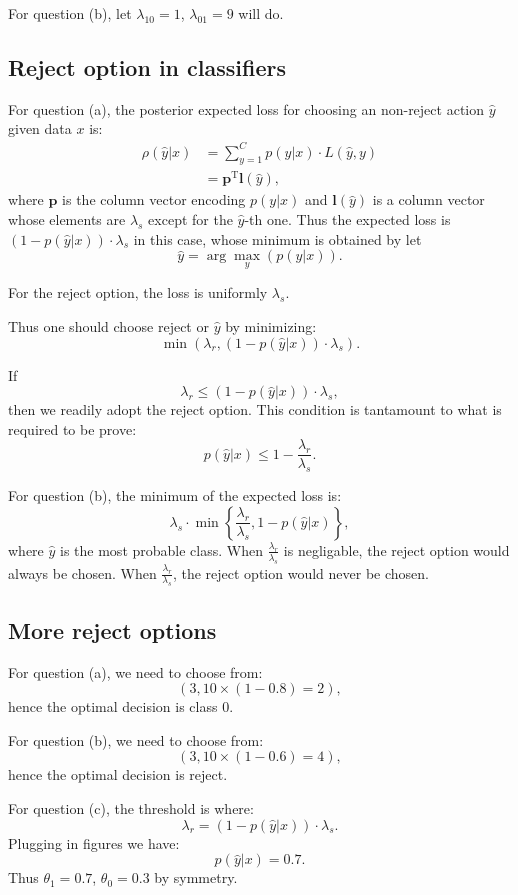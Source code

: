 \documentclass[UTF8]{ctexart}
\begin{document}
For question (b), let $\lambda_{10}=1$, $\lambda_{01}=9$ will do.

\subsection{Reject option in classifiers}
For question (a), the posterior expected loss for choosing an non-reject action $\hat{y}$ given data $x$ is:
$$
\begin{aligned}
\rho(\hat{y}|x)&=\sum_{y=1}^{C} p(y|x)\cdot L(\hat{y},y)\\
&=\textbf{p}^{\text{T}}\textbf{l}(\hat{y}),
\end{aligned}
$$
where $\textbf{p}$ is the column vector encoding $p(y|x)$ and $\textbf{l}(\hat{y})$ is a column vector whose elements are $\lambda_{s}$ except for the $\hat{y}$-th one.
Thus the expected loss is $(1-p(\hat{y}|x))\cdot\lambda_{s}$ in this case, whose minimum is obtained by let
$$\hat{y}=\arg\max_{y}(p(y|x)).$$

For the reject option, the loss is uniformly $\lambda_{s}$.

Thus one should choose reject or $\hat{y}$ by minimizing:
$$\min (\lambda_{r},(1-p(\hat{y}|x))\cdot \lambda_{s}).$$

If
$$\lambda_{r}\leq (1-p(\hat{y}|x))\cdot\lambda_{s},$$
then we readily adopt the reject option.
This condition is tantamount to what is required to be prove:
$$p(\hat{y}|x)\leq 1-\frac{\lambda_{r}}{\lambda_{s}}.$$

For question (b), the minimum of the expected loss is:
$$\lambda_{s}\cdot \min\left\{\frac{\lambda_{r}}{\lambda_{s}},1-p(\hat{y}|x) \right\},$$
where $\hat{y}$ is the most probable class.
When $\frac{\lambda_{r}}{\lambda_{s}}$ is negligable, the reject option would always be chosen.
When $\frac{\lambda_{r}}{\lambda_{s}}$, the reject option would never be chosen.


\subsection{More reject options}
For question (a), we need to choose from:
$$(3,10\times (1-0.8)=2),$$
hence the optimal decision is class $0$.

For question (b), we need to choose from:
$$(3,10\times (1-0.6)=4),$$
hence the optimal decision is reject.

For question (c), the threshold is where:
$$\lambda_{r}=(1-p(\hat{y}|x))\cdot \lambda_{s}.$$
Plugging in figures we have:
$$p(\hat{y}|x)=0.7.$$
Thus $\theta_{1}=0.7$, $\theta_{0}=0.3$ by symmetry.
\end{document}
